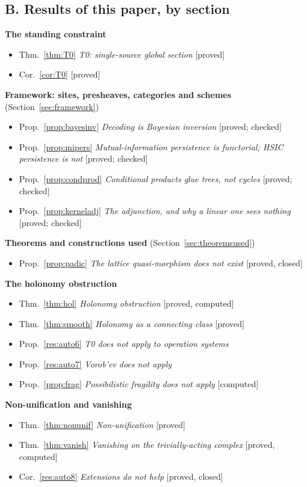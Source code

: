 \documentclass[11pt]{article}
\theoremstyle{definition}
\theoremstyle{remark}
\begin{document}
\subsection*{B. Results of this paper, by section}
\noindent\textbf{The standing constraint}
\begin{itemize}[itemsep=0pt]
  \item Thm.~\ref{thm:T0} \emph{T0: single-source global section} [proved]
  \item Cor.~\ref{cor:T0} [proved]
\end{itemize}
\noindent\textbf{Framework: sites, presheaves, categories and schemes} (Section~\ref{sec:framework})
\begin{itemize}[itemsep=0pt]
  \item Prop.~\ref{prop:bayesinv} \emph{Decoding is Bayesian inversion} [proved; checked]
  \item Prop.~\ref{prop:mipers} \emph{Mutual-information persistence is functorial; HSIC persistence is not} [proved; checked]
  \item Prop.~\ref{prop:condprod} \emph{Conditional products glue trees, not cycles} [proved; checked]
  \item Prop.~\ref{prop:kerneladj} \emph{The adjunction, and why a linear one sees nothing} [proved; checked]
\end{itemize}
\noindent\textbf{Theorems and constructions used} (Section~\ref{sec:theoremsused})
\begin{itemize}[itemsep=0pt]
  \item Prop.~\ref{prop:padic} \emph{The lattice quasi-morphism does not exist} [proved, closed]
\end{itemize}
\noindent\textbf{The holonomy obstruction}
\begin{itemize}[itemsep=0pt]
  \item Thm.~\ref{thm:hol} \emph{Holonomy obstruction} [proved, computed]
  \item Thm.~\ref{thm:smooth} \emph{Holonomy as a connecting class} [proved]
  \item Prop.~\ref{res:auto6} \emph{T0 does not apply to operation systems}
  \item Prop.~\ref{res:auto7} \emph{Vorob'ev does not apply}
  \item Prop.~\ref{prop:frag} \emph{Possibilistic fragility does not apply} [computed]
\end{itemize}
\noindent\textbf{Non-unification and vanishing}
\begin{itemize}[itemsep=0pt]
  \item Thm.~\ref{thm:nonunif} \emph{Non-unification} [proved]
  \item Thm.~\ref{thm:vanish} \emph{Vanishing on the trivially-acting complex} [proved, computed]
  \item Cor.~\ref{res:auto8} \emph{Extensions do not help} [proved, closed]
\end{itemize}
\end{document}
